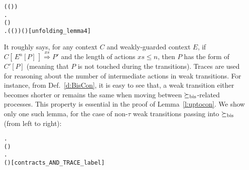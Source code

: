 {\begin{alltt}
\begin{small}
\HOLTokenTurnstile{}   \HOLSymConst{\HOLTokenConj{}}   \HOLSymConst{\HOLTokenConj{}}  (( \HOLSymConst{\HOLTokenCompose}   ) )   \HOLSymConst{\HOLTokenConj{}}
     \HOLSymConst{\HOLTokenLeq{}}  \HOLSymConst{\HOLTokenImp{}}
   \HOLSymConst{\HOLTokenExists{}}.
         \HOLSymConst{\HOLTokenConj{}} ( \HOLSymConst{=}  ) \HOLSymConst{\HOLTokenConj{}}
       \HOLSymConst{\HOLTokenForall{}}.  (( \HOLSymConst{\HOLTokenCompose}   ) )  ( )\hfill{[unfolding_lemma4]}
\end{small}
\end{alltt}

It roughly says, for any context $C$ and weakly-guarded context
$E$, if $C [\, E^n[P]\,] \overset{xs}{\Longrightarrow} P'$ and the length
of actions $xs \leqslant n$, then $P$ has the form of $C'[P]$ (meaning
that $P$ is not touched during the transitions). Traces are used for
reasoning about the number of intermediate actions in weak
transitions. For instance, from Def.~\ref{d:BisCon}, it is easy
to see that, a weak transition either becomes shorter
or remains the same when moving between $\mathrel{\succeq_{\rm{bis}}}$-related processes.
This property is essential in the proof of
Lemma~\ref{l:uptocon}. We show only one such lemma, for the case of
non-$\tau$ weak transitions passing into $\mathrel{\succeq_{\rm{bis}}}$ (from left to right):
\begin{alltt}
\HOLTokenTurnstile{}  \HOLSymConst{\HOLTokenContracts{}}  \HOLSymConst{\HOLTokenImp{}}
   \HOLSymConst{\HOLTokenForall{}}  .
           \HOLSymConst{\HOLTokenConj{}}  ( )  \HOLSymConst{\HOLTokenImp{}}
       \HOLSymConst{\HOLTokenExists{}} .
               \HOLSymConst{\HOLTokenConj{}}  \HOLSymConst{\HOLTokenContracts{}}  \HOLSymConst{\HOLTokenConj{}}   \HOLSymConst{\HOLTokenLeq{}}   \HOLSymConst{\HOLTokenConj{}}
            ( ) \hfill{[contracts_AND_TRACE_label]}
\end{alltt}

}
